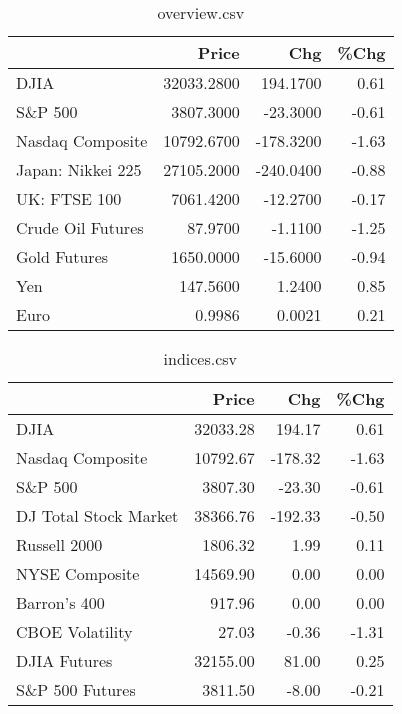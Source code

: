 \documentclass{article}%
\begin{document}
\begin{table}[htbp]%
\caption{overview.csv}%
\centering%
\begin{adjustbox}{width=1\textwidth}%
\begin{tabular}{lrrr}
\toprule
                  &      Price &       Chg &  \%Chg \\
\midrule
             DJIA & 32033.2800 &  194.1700 &  0.61 \\
          S\&P 500 &  3807.3000 &  -23.3000 & -0.61 \\
 Nasdaq Composite & 10792.6700 & -178.3200 & -1.63 \\
Japan: Nikkei 225 & 27105.2000 & -240.0400 & -0.88 \\
     UK: FTSE 100 &  7061.4200 &  -12.2700 & -0.17 \\
Crude Oil Futures &    87.9700 &   -1.1100 & -1.25 \\
     Gold Futures &  1650.0000 &  -15.6000 & -0.94 \\
              Yen &   147.5600 &    1.2400 &  0.85 \\
             Euro &     0.9986 &    0.0021 &  0.21 \\
\bottomrule
\end{tabular}
%
\end{adjustbox}%
\end{table}

%


\begin{table}[htbp]%
\caption{indices.csv}%
\centering%
\begin{adjustbox}{width=1\textwidth}%
\begin{tabular}{lrrr}
\toprule
                      &    Price &     Chg &  \%Chg \\
\midrule
                 DJIA & 32033.28 &  194.17 &  0.61 \\
     Nasdaq Composite & 10792.67 & -178.32 & -1.63 \\
              S\&P 500 &  3807.30 &  -23.30 & -0.61 \\
DJ Total Stock Market & 38366.76 & -192.33 & -0.50 \\
         Russell 2000 &  1806.32 &    1.99 &  0.11 \\
       NYSE Composite & 14569.90 &    0.00 &  0.00 \\
         Barron's 400 &   917.96 &    0.00 &  0.00 \\
      CBOE Volatility &    27.03 &   -0.36 & -1.31 \\
         DJIA Futures & 32155.00 &   81.00 &  0.25 \\
      S\&P 500 Futures &  3811.50 &   -8.00 & -0.21 \\
\bottomrule
\end{tabular}
%
\end{adjustbox}%
\end{table}
\end{document}
